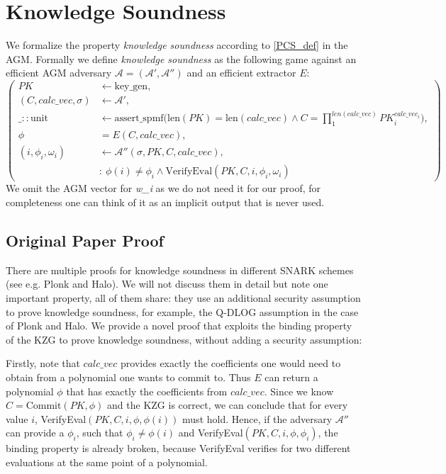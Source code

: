 \section{Knowledge Soundness}
\label{security:knowledgesound}
We formalize the property \textit{knowledge soundness} according to \ref{PCS_def} in the AGM. Formally we define \textit{knowledge soundness} as the following game against an efficient AGM adversary $\mathcal{A=(A',A'')}$ and an efficient extractor $E$: 
\begin{equation*}
    \left(
        \begin{aligned}
            PK &\leftarrow \text{key\_gen}, \\
            (C,calc\_vec, \sigma) &\leftarrow \mathcal{A'}, \\
            \_::\text{unit} &\leftarrow \text{assert\_spmf}\biggl(\text{len}(PK)=\text{len}(calc\_vec) \land C = \prod_{1}^{len(calc\_vec)}PK_i^{calc\_vec_i}\biggr), \\
            \phi &= E(C, calc\_vec),\\
            (i, \phi_i, \omega_i) &\leftarrow \mathcal{A''}(\sigma, PK, C, calc\_vec), \\
            & : \ \phi(i) \ne \phi_i \land \text{VerifyEval}(PK,C,i,\phi_i,\omega_i)
        \end{aligned}
        \right)
\end{equation*}
We omit the AGM vector for \textit{w\_i} as we do not need it for our proof, for completeness one can think of it as an implicit output that is never used.

\subsection*{Original Paper Proof}
\label{security:knowledge:paper}
There are multiple proofs for knowledge soundness in different SNARK schemes (see e.g. Plonk\parencite{plonk} and Halo\parencite{halo}). We will not discuss them in detail but note one important property, all of them share: they use an additional security assumption to prove knowledge soundness, for example, the Q-DLOG assumption in the case of Plonk and Halo. We provide a novel proof that exploits the binding property of the KZG to prove knowledge soundness, without adding a security assumption: 

Firstly, note that $calc\_vec$ provides exactly the coefficients one would need to obtain from a polynomial one wants to commit to. Thus $E$ can return a polynomial $\phi$ that has exactly the coefficients from $calc\_vec$. Since we know $C= \text{Commit}(PK, \phi)$ and the KZG is correct, we can conclude that for every value $i$, VerifyEval$(PK, C, i, \phi, \phi(i))$ must hold. Hence, if the adversary $\mathcal{A''}$ can provide a $\phi_i$, such that $\phi_i\ne\phi(i)$
and VerifyEval$(PK, C, i, \phi, \phi_i)$, the binding property is already broken, because VerifyEval verifies for two different evaluations at the same point of a polynomial.


